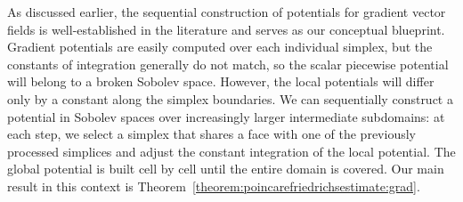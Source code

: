 \documentclass[10pt,a4paper]{article}
\begin{document}


As discussed earlier, the sequential construction of potentials for gradient vector fields is well-established in the literature and serves as our conceptual blueprint.
Gradient potentials are easily computed over each individual simplex, but the constants of integration generally do not match, so the scalar piecewise potential will belong to a broken Sobolev space.
However, the local potentials will differ only by a constant along the simplex boundaries.
We can sequentially construct a potential in Sobolev spaces over increasingly larger intermediate subdomains: at each step, we select a simplex that shares a face with one of the previously processed simplices and adjust the constant integration of the local potential.
The global potential is built cell by cell until the entire domain is covered.
Our main result in this context is Theorem~\ref{theorem:poincarefriedrichsestimate:grad}.



\end{document}
